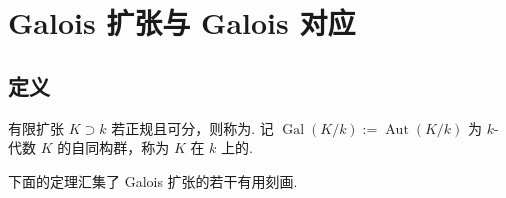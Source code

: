 \section{Galois 扩张与 Galois 对应}\label{sec:galois-2-7}
\subsection{定义}\label{sec:galois-2-7-1}
\begin{definition*}有限扩张 $K\supset k$ 若正规且可分，则称为. 记 $\operatorname{Gal}(K/k):=\operatorname{Aut}(K/k)$ 为 $k$-代数 $K$ 的自同构群，称为 $K$ 在 $k$ 上的.\end{definition*}
下面的定理汇集了 Galois 扩张的若干有用刻画.
